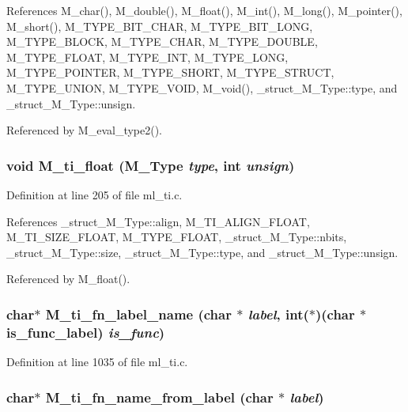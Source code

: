 References M\_\-char(), M\_\-double(), M\_\-float(), M\_\-int(), M\_\-long(), M\_\-pointer(), M\_\-short(), M\_\-TYPE\_\-BIT\_\-CHAR, M\_\-TYPE\_\-BIT\_\-LONG, M\_\-TYPE\_\-BLOCK, M\_\-TYPE\_\-CHAR, M\_\-TYPE\_\-DOUBLE, M\_\-TYPE\_\-FLOAT, M\_\-TYPE\_\-INT, M\_\-TYPE\_\-LONG, M\_\-TYPE\_\-POINTER, M\_\-TYPE\_\-SHORT, M\_\-TYPE\_\-STRUCT, M\_\-TYPE\_\-UNION, M\_\-TYPE\_\-VOID, M\_\-void(), \_\-struct\_\-M\_\-Type::type, and \_\-struct\_\-M\_\-Type::unsign.

Referenced by M\_\-eval\_\-type2().
\subsubsection{\setlength{\rightskip}{0pt plus 5cm}void M\_\-ti\_\-float (\bf{M\_\-Type} {\em type}, int {\em unsign})}\label{ml__ti_8c_470700be28327137b93ff17d43451e6e}




Definition at line 205 of file ml\_\-ti.c.

References \_\-struct\_\-M\_\-Type::align, M\_\-TI\_\-ALIGN\_\-FLOAT, M\_\-TI\_\-SIZE\_\-FLOAT, M\_\-TYPE\_\-FLOAT, \_\-struct\_\-M\_\-Type::nbits, \_\-struct\_\-M\_\-Type::size, \_\-struct\_\-M\_\-Type::type, and \_\-struct\_\-M\_\-Type::unsign.

Referenced by M\_\-float().
\subsubsection{\setlength{\rightskip}{0pt plus 5cm}char$\ast$ M\_\-ti\_\-fn\_\-label\_\-name (char $\ast$ {\em label}, int($\ast$)(char $\ast$is\_\-func\_\-label) {\em is\_\-func})}\label{ml__ti_8c_9b25ba9608d5105b695d8edcb3f5be61}




Definition at line 1035 of file ml\_\-ti.c.
\subsubsection{\setlength{\rightskip}{0pt plus 5cm}char$\ast$ M\_\-ti\_\-fn\_\-name\_\-from\_\-label (char $\ast$ {\em label})}\label{ml__ti_8c_aeaa8b8fde571ac42208d73f0ccd6bb5}




